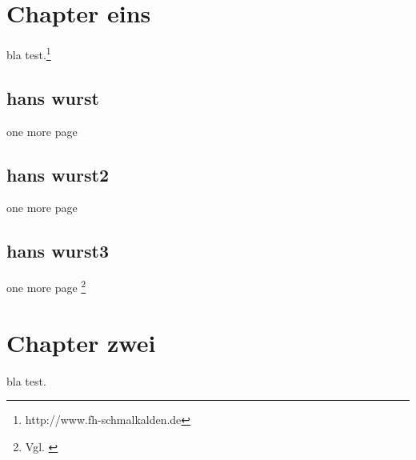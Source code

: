 \chapter{Chapter eins}
bla test.\footnote{http://www.fh-schmalkalden.de}
\newpage

\section{hans wurst}
one more page

\newpage
\section{hans wurst2}
one more page

\newpage
\section{hans wurst3}
one more page \footnote{Vgl. \cite{braun:scala}}

\chapter{Chapter zwei}
bla test.